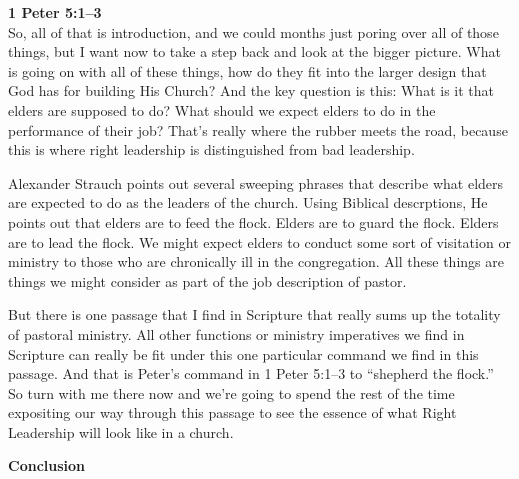 \documentclass[letterpaper, 12pt]{article}
\begin{document}
    \noindent \textbf{1 Peter 5:1--3} \\

    So, all of that is introduction, and we could months just poring
    over all of those things, but I want now to take a step back and
    look at the bigger picture. What is going on with all of these
    things, how do they fit into the larger design that God has for
    building His Church? And the key question is this: What is it that
    elders are supposed to do? What should we expect elders to do in the
    performance of their job? That's really where the rubber meets the
    road, because this is where right leadership is distinguished from
    bad leadership.

    Alexander Strauch points out several sweeping phrases that describe
    what elders are expected to do as the leaders of the church. Using
    Biblical descrptions, He points out that elders are to feed the
    flock. Elders are to guard the flock. Elders are to lead the flock.
    We might expect elders to conduct some sort of visitation or
    ministry to those who are chronically ill in the congregation. All
    these things are things we might consider as part of the job
    description of pastor.

    But there is one passage that I find in Scripture that really sums
    up the totality of pastoral ministry. All other functions or
    ministry imperatives we find in Scripture can really be fit under
    this one particular command we find in this passage. And that is
    Peter's command in 1 Peter 5:1--3 to ``shepherd the flock.'' So turn
    with me there now and we're going to spend the rest of the time
    expositing our way through this passage to see the essence of what
    Right Leadership will look like in a church.

    $ $\\

    \noindent \textbf{Conclusion} \\
\end{document}
